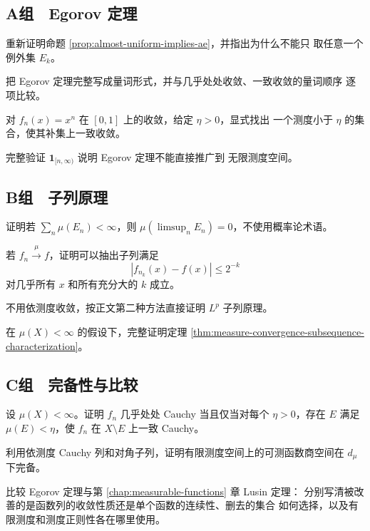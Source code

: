 \subsection*{A组　Egorov 定理}
\begin{enumerate}[label=\textbf{\thechapter.\arabic*.}]
重新证明命题 \ref{prop:almost-uniform-implies-ae}，并指出为什么不能只
取任意一个例外集 \(E_k\)。

把 Egorov 定理完整写成量词形式，并与几乎处处收敛、一致收敛的量词顺序
逐项比较。

对 \(f_n(x)=x^n\) 在 \([0,1]\) 上的收敛，给定 \(\eta>0\)，显式找出
一个测度小于 \(\eta\) 的集合，使其补集上一致收敛。

完整验证 \(\mathbf1_{[n,\infty)}\) 说明 Egorov 定理不能直接推广到
无限测度空间。

\end{enumerate}
\subsection*{B组　子列原理}
\begin{enumerate}[label=\textbf{\thechapter.\arabic*.},resume]
证明若 \(\sum_n\mu(E_n)<\infty\)，则
\(\mu(\limsup_nE_n)=0\)，不使用概率论术语。

若 \(f_n\xrightarrow{\mu}f\)，证明可以抽出子列满足
\[
 |f_{n_k}(x)-f(x)|\le 2^{-k}
\]
对几乎所有 \(x\) 和所有充分大的 \(k\) 成立。

不用依测度收敛，按正文第二种方法直接证明 \(L^p\) 子列原理。

在 \(\mu(X)<\infty\) 的假设下，完整证明定理
\ref{thm:measure-convergence-subsequence-characterization}。

\end{enumerate}
\subsection*{C组　完备性与比较}
\begin{enumerate}[label=\textbf{\thechapter.\arabic*.},resume]
设 \(\mu(X)<\infty\)。证明 \(f_n\) 几乎处处 Cauchy 当且仅当对每个
\(\eta>0\)，存在 \(E\) 满足 \(\mu(E)<\eta\)，使 \(f_n\) 在
\(X\setminus E\) 上一致 Cauchy。

利用依测度 Cauchy 列和对角子列，证明有限测度空间上的可测函数商空间在
\(d_\mu\) 下完备。

比较 Egorov 定理与第 \ref{chap:measurable-functions} 章 Lusin 定理：
分别写清被改善的是函数列的收敛性质还是单个函数的连续性、删去的集合
如何选择，以及有限测度和测度正则性各在哪里使用。
\end{enumerate}
